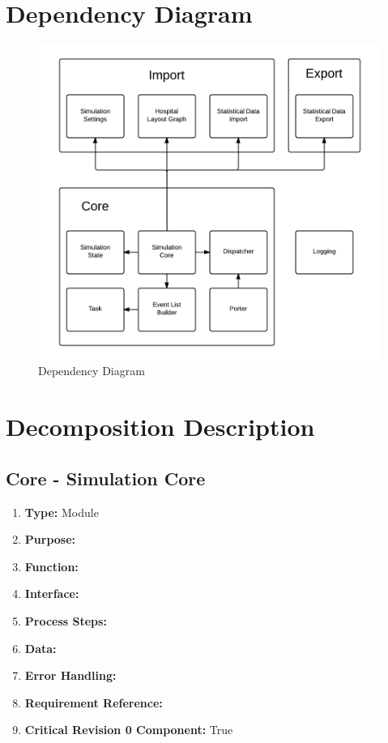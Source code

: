 \documentclass[paper=letter, fontsize=10pt]{scrartcl}
\numberwithin{equation}{section}		%
\numberwithin{figure}{section}			%
\numberwithin{table}{section}				%
\begin{document}
\section{Dependency Diagram}

\begin{figure}[H]
	\begin{center}
		\includegraphics[width=1\columnwidth]{../Process Diagrams/Dependency Diagram.png}
		\caption{Dependency Diagram}
	\end{center}
\end{figure}
\newpage

\section{Decomposition Description}
\subsection{Core - Simulation Core}
\begin{enumerate}[]
	\item \textbf{Type:} Module
	\item \textbf{Purpose:} 
	\item \textbf{Function:} 
	\item \textbf{Interface:}
	\item \textbf{Process Steps:} 
	\item \textbf{Data:}
	\item \textbf{Error Handling:}
	\item \textbf{Requirement Reference:}
	\item \textbf{Critical Revision 0 Component:} True
\end{enumerate}
\end{document}
